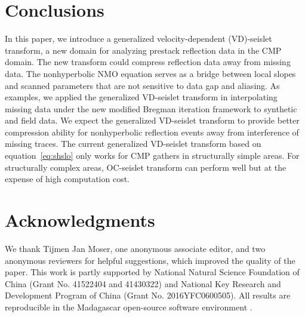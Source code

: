 \section{Conclusions}

In this paper, we introduce a generalized velocity-dependent
(VD)-seislet transform, a new domain for analyzing prestack reflection
data in the CMP domain. The new transform could compress reflection
data away from missing data. The nonhyperbolic NMO equation serves as
a bridge between local slopes and scanned parameters that are not
sensitive to data gap and aliasing. As examples, we applied the
generalized VD-seislet transform in interpolating missing data under
the new modified Bregman iteration framework to synthetic and field
data. We expect the generalized VD-seislet transform to provide better
compression ability for nonhyperbolic reflection events away from
interference of missing traces. The current generalized VD-seislet
transform based on equation~\ref{eq:shslo} only works for CMP gathers
in structurally simple areas. For structurally complex areas,
OC-seislet transform \cite[]{Liu10} can perform well but at the
expense of high computation cost.

\section{Acknowledgments}
We thank Tijmen Jan Moser, one anonymous associate editor, and two
anonymous reviewers for helpful suggestions, which improved the
quality of the paper. This work is partly supported by National
Natural Science Foundation of China (Grant No. 41522404 and 41430322)
and National Key Research and Development Program of China (Grant
No. 2016YFC0600505). All results are reproducible in the Madagascar
open-source software environment \cite[]{m8r}.




